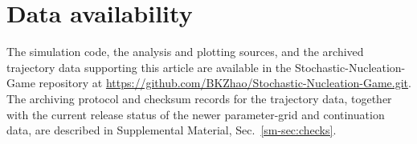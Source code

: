 \section*{Data availability}

The simulation code, the analysis and plotting sources, and the archived trajectory data supporting this article are available in the Stochastic-Nucleation-Game repository at \url{https://github.com/BKZhao/Stochastic-Nucleation-Game.git}. The archiving protocol and checksum records for the trajectory data, together with the current release status of the newer parameter-grid and continuation data, are described in Supplemental Material, Sec.~\ref{sm-sec:checks}.
